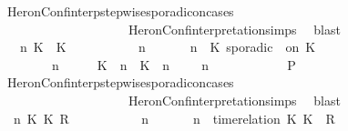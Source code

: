 \begin{isabellebody}
\ HeronConf{\isacharunderscore}interp{\isacharunderscore}stepwise{\isacharunderscore}sporadicon{\isacharunderscore}cases\isanewline
\ \ \ \ \ \ \ \ \ \ \ \ \ \ \ \ \ \ \ \ HeronConf{\isacharunderscore}interpretation{\isachardot}simps\ \isamarkupfalse%
\ blast\isanewline
\ \ \ \ \isamarkupfalse%
\isanewline
\ \ \ \ \ \ \isamarkupfalse%
\ \ {\isasymGamma}\ n\ K\ {\isasymtau}\ K\ {\isasymPsi}\ {\isasymPhi}\isanewline
\ \ \ \ \ \ \isamarkupfalse%
\ {\isacartoucheopen}{\isacharparenleft}{\isasymGamma}\ n\ {\isasymturnstile}\ {\isasymPsi}\ {\isasymtriangleright}\ {\isasymPhi}\ {\isacharequal}\ {\isacharparenleft}{\isasymGamma}{\isacharcomma}\ n\ {\isasymturnstile}\ {\isacharparenleft}K\ sporadic\ {\isasymtau}\ on\ K\ {\isacharhash}\ {\isasymPsi}\ {\isasymtriangleright}\ {\isasymPhi}{\isacharparenright}{\isacartoucheclose}\isanewline
\ \ \ \ \ \ \ {\isacartoucheopen}{\isacharparenleft}{\isasymGamma}\ n\ {\isasymturnstile}\ {\isasymPsi}\ {\isasymtriangleright}\ {\isasymPhi}\ {\isacharequal}\ {\isacharparenleft}{\isacharparenleft}{\isacharparenleft}K\ {\isasymUp}\ n{\isacharparenright}\ {\isacharhash}\ {\isacharparenleft}K\ {\isasymDown}\ n\ {\isacharat}\ {\isasymtau}{\isacharparenright}\ {\isacharhash}\ {\isasymGamma}{\isacharparenright}{\isacharcomma}\ n\ {\isasymturnstile}\ {\isasymPsi}\ {\isasymtriangleright}\ {\isasymPhi}{\isacharparenright}{\isacartoucheclose}\isanewline
\ \ \ \ \ \ \isamarkupfalse%
\ {\isacharquery}P\ \isamarkupfalse%
\ HeronConf{\isacharunderscore}interp{\isacharunderscore}stepwise{\isacharunderscore}sporadicon{\isacharunderscore}cases\isanewline
\ \ \ \ \ \ \ \ \ \ \ \ \ \ \ \ \ \ \ \ HeronConf{\isacharunderscore}interpretation{\isachardot}simps\ \isamarkupfalse%
\ blast\isanewline
\ \ \ \ \isamarkupfalse%
\isanewline
\ \ \ \ \ \ \isamarkupfalse%
\ {\isasymGamma}\ n\ K\ K\ R\ {\isasymPsi}\ {\isasymPhi}\isanewline
\ \ \ \ \ \ \isamarkupfalse%
\ {\isacartoucheopen}{\isacharparenleft}{\isasymGamma}\ n\ {\isasymturnstile}\ {\isasymPsi}\ {\isasymtriangleright}\ {\isasymPhi}\ {\isacharequal}\ {\isacharparenleft}{\isasymGamma}{\isacharcomma}\ n\ {\isasymturnstile}\ {\isacharparenleft}time{\isacharminus}relation\ {\isasymlfloor}K\ K\ {\isasymin}\ R{\isacharparenright}\ {\isacharhash}\ {\isasymPsi}\ {\isasymtriangleright}\ {\isasymPhi}{\isacharparenright}{\isacartoucheclose}\isanewline

\end{isabellebody}
